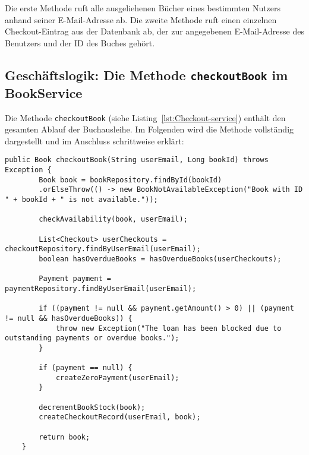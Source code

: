 \noindent Die erste Methode ruft alle ausgeliehenen Bücher eines bestimmten Nutzers anhand seiner E-Mail-Adresse ab. Die zweite Methode ruft einen einzelnen Checkout-Eintrag aus der Datenbank ab, der zur angegebenen E-Mail-Adresse des Benutzers und der ID des Buches gehört.

\subsection*{Geschäftslogik: Die Methode \texttt{checkoutBook} im BookService}

Die Methode \texttt{checkoutBook} (siehe Listing~\ref{lst:Checkout-service}) enthält den gesamten Ablauf der Buchausleihe. Im Folgenden wird die Methode vollständig dargestellt und im Anschluss schrittweise erklärt:

\begin{lstlisting}[style=pseudocode, caption=checkoutBook() Methode im BookService.java, label=lst:Checkout-service]
	public Book checkoutBook(String userEmail, Long bookId) throws Exception {
		Book book = bookRepository.findById(bookId)
		.orElseThrow(() -> new BookNotAvailableException("Book with ID " + bookId + " is not available."));
		
		checkAvailability(book, userEmail);
		
		List<Checkout> userCheckouts = checkoutRepository.findByUserEmail(userEmail);
		boolean hasOverdueBooks = hasOverdueBooks(userCheckouts);
		
		Payment payment = paymentRepository.findByUserEmail(userEmail);
		
		if ((payment != null && payment.getAmount() > 0) || (payment != null && hasOverdueBooks)) {
			throw new Exception("The loan has been blocked due to outstanding payments or overdue books.");
		}
		
		if (payment == null) {
			createZeroPayment(userEmail);
		}
		
		decrementBookStock(book);
		createCheckoutRecord(userEmail, book);
		
		return book;
	}
\end{lstlisting}

